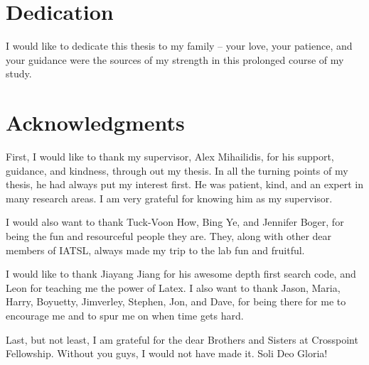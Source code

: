 \documentclass{ut-thesis}
\begin{document}
\begin{preliminary}
\section*{Dedication}
I would like to dedicate this thesis to my family -- your love, your patience, and your guidance were the sources of my strength in this prolonged course of my study.


\section*{Acknowledgments}
First, I would like to thank my supervisor, Alex Mihailidis, for his support, guidance, and kindness, through out my thesis.  In all the turning points of my thesis, he had always put my interest first.  He was patient, kind, and an expert in many research areas.  I am very grateful for knowing him as my supervisor.

I would also want to thank Tuck-Voon How, Bing Ye, and Jennifer Boger, for being the fun and resourceful people they are.  They, along with other dear members of IATSL, always made my trip to the lab fun and fruitful.

I would like to thank Jiayang Jiang for his awesome depth first search code, and Leon for teaching me the power of Latex.  I also want to thank Jason, Maria, Harry, Boyuetty, Jimverley, Stephen, Jon, and Dave, for being there for me to encourage me and to spur me on when time gets hard.

Last, but not least, I am grateful for the dear Brothers and Sisters at Crosspoint Fellowship.  Without you guys, I would not have made it.  Soli Deo Gloria!


\listoffigures
\listoftables


\tableofcontents


\end{preliminary}
\end{document}
